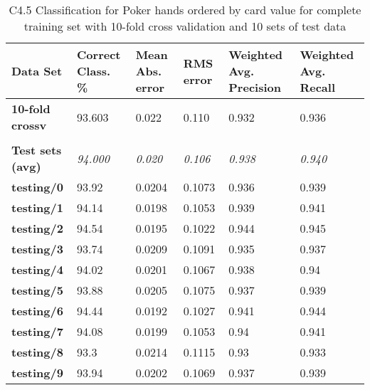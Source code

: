 \documentclass[10pt, a4paper]{article}
\begin{document}
\begin{table}[htbp]
  \centering
  \begin{tabular}{p{3cm}p{1.5cm}p{1.5cm}p{1.5cm}p{1.5cm}p{1.5cm}}
    \toprule
    \textbf{Data Set} & Correct Class. \% & Mean Abs. error & RMS error & Weighted Avg. Precision & Weighted Avg. Recall \\
    \midrule
    \textbf{10-fold crossv} & 93.603 & 0.022 & 0.110 & 0.932 & 0.936 \\
    \textbf{} &       &       &       &       &  \\
    \textbf{Test sets (avg)} & \textit{94.000} & \textit{0.020} & \textit{0.106} & \textit{0.938} & \textit{0.940} \\
    \textbf{   testing/0} & 93.92 & 0.0204 & 0.1073 & 0.936 & 0.939 \\
    \textbf{   testing/1} & 94.14 & 0.0198 & 0.1053 & 0.939 & 0.941 \\
    \textbf{   testing/2} & 94.54 & 0.0195 & 0.1022 & 0.944 & 0.945 \\
    \textbf{   testing/3} & 93.74 & 0.0209 & 0.1091 & 0.935 & 0.937 \\
    \textbf{   testing/4} & 94.02 & 0.0201 & 0.1067 & 0.938 & 0.94 \\
    \textbf{   testing/5} & 93.88 & 0.0205 & 0.1075 & 0.937 & 0.939 \\
    \textbf{   testing/6} & 94.44 & 0.0192 & 0.1027 & 0.941 & 0.944 \\
    \textbf{   testing/7} & 94.08 & 0.0199 & 0.1053 & 0.94  & 0.941 \\
    \textbf{   testing/8} & 93.3  & 0.0214 & 0.1115 & 0.93  & 0.933 \\
    \textbf{   testing/9} & 93.94 & 0.0202 & 0.1069 & 0.937 & 0.939 \\
    \bottomrule
    \end{tabular}%

\caption{C4.5 Classification for Poker hands ordered by card value for complete training set with 10-fold cross validation and 10 sets of test data}   
  \label{tab:dtocresults}%
\end{table}%
\end{document}

